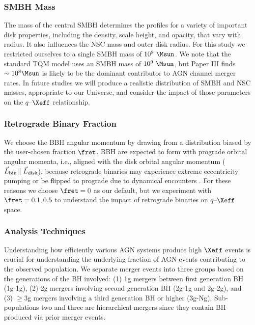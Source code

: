\subsubsection{SMBH Mass}
\label{sec:smbh-mass}
The mass of the central SMBH determines the profiles for a variety of important disk properties, including the density, scale height, and opacity, that vary with radius.
It also influences the NSC mass and outer disk radius.
For this study we restricted ourselves to a single SMBH mass of $10^8~\Msun$.
We note that the standard TQM model uses an SMBH mass of $10^9~\Msun$, but Paper III finds $\sim 10^{8}\Msun$ is likely to be the dominant contributor to AGN channel merger rates.
In future studies we will produce a realistic distribution of SMBH and NSC masses, appropriate to our Universe, and consider the impact of those parameters on the $q$--$\Xeff$ relationship.

\subsubsection{Retrograde Binary Fraction}
We choose the BBH angular momentum by drawing from a distribution biased by the user-chosen fraction $\fret$.
BBH  are expected to form with prograde orbital angular momenta, i.e., aligned with the disk orbital angular momentum ($\vec{L}_{\rm bin}\,||\,\vec{L}_{\rm disk}$), because retrograde binaries may experience extreme eccentricity pumping \citep{Wang+21} or be flipped to prograde due to dynamical encounters \citep{Samsing+22,McKernanFord24}.
For these reasons we choose $\fret=0$ as our default, but we  experiment with $\fret=0.1, 0.5$ to understand the impact of retrograde binaries on $q$--$\Xeff$ space.



\subsubsection{Analysis Techniques}
Understanding how efficiently various AGN systems produce high $\Xeff$ events is crucial for understanding the underlying fraction of AGN events contributing to the observed population.
We separate merger events into three groups based on the generations of the BH involved: (1) 1g mergers between first generation BH (1g-1g), (2) 2g mergers involving second generation BH (2g-1g and 2g-2g), and (3) $\geq$3g mergers involving a third generation BH or higher (3g-Ng).
Sub-populations two and three are hierarchical mergers since they contain BH produced via prior merger events.

